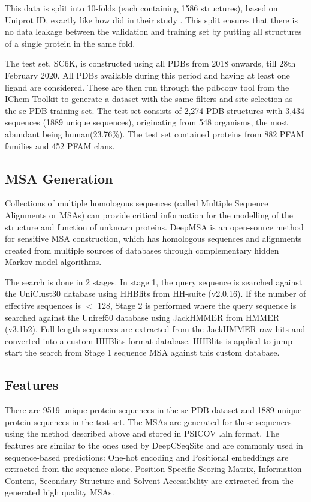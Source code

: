 \documentclass[journal=jacsat,manuscript=article]{achemso}
\begin{document}
This data is split into 10-folds (each containing 1586 structures), based on Uniprot ID, exactly like how \citeauthor{stepniewska2020improving} did in their study \cite{stepniewska2020improving}. This split ensures that there is no data leakage between the validation and training set by putting all structures of a single protein in the same fold.

The test set, SC6K, is constructed using all PDBs from 2018 onwards, till 28th February 2020. All PDBs available during this period and having at least one ligand are considered. These are then run through the pdbconv tool from the IChem Toolkit \cite{da2018ichem} to generate a dataset with the same filters and site selection as the sc-PDB\cite{desaphy2015sc} training set. The test set consists of 2,274 PDB structures with 3,434 sequences (1889 unique sequences), originating from 548 organisms, the most abundant being human(23.76\%). The test set contained proteins from 882 PFAM families and 452 PFAM clans.

\subsection{MSA Generation}
\quad Collections of multiple homologous sequences (called Multiple Sequence Alignments or MSAs) can provide critical information for the modelling of the structure and function of unknown proteins. DeepMSA \cite{zhang2020deepmsa} is an open-source method for sensitive MSA construction, which has homologous sequences and alignments created from multiple sources of databases through complementary hidden Markov model algorithms.

The search is done in 2 stages. In stage 1, the query sequence is searched against the UniClust30 \cite{mirdita2017uniclust} database using HHBlits from HH-suite\cite{remmert2012hhblits} (v2.0.16). If the number of effective sequences is $<$ 128, Stage 2 is performed where the query sequence is searched against the Uniref50 \cite{suzek2015uniref} database using JackHMMER from HMMER \cite{johnson2010hidden} (v3.1b2). Full-length sequences are extracted from the JackHMMER raw hits and converted into a custom HHBlits format database. HHBlits is applied to jump-start the search from Stage 1 sequence MSA against this custom database.


\subsection{Features}
\quad There are 9519 unique protein sequences in the sc-PDB\cite{desaphy2015sc} dataset and 1889 unique protein sequences in the test set. The MSAs are generated for these sequences using the method described above and stored in PSICOV \cite{jones2012psicov} .aln format. The features are similar to the ones used by DeepCSeqSite\cite{cui2019predicting} and are commonly used in sequence-based predictions: One-hot encoding and Positional embeddings are extracted from the sequence alone. Position Specific Scoring Matrix, Information Content, Secondary Structure and Solvent Accessibility are extracted from the generated high quality MSAs.
\end{document}
